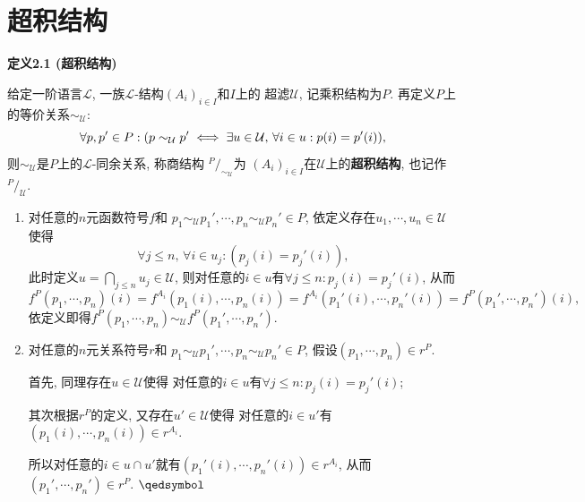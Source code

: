 \documentclass[UTF8]{ctexart}
\begin{document}
\newpage

\section{超积结构}

\hypertarget{sec:定义2.1}{}
\noindent\textbf{定义2.1 (超积结构)}

给定一阶语言$\mathcal{L}$, 一族$\mathcal{L}$-结构$(A_i)_{i\in I}$和$I$上的
超滤$\mathcal{U}$, 记乘积结构为$P$. 再定义$P$上的等价关系$\sim_{\mathcal{U}}$:
\[
    \forall p,p'\in P:(p\sim_{\mathcal{U}}p'\iff
    \exists u\in\mathcal{U},\,\forall i\in u:p(i)=p'(i)),\\[3pt]
\]
则$\sim_{\mathcal{U}}$是$P$上的$\mathcal{L}$-同余关系, 称商结构
$^{\displaystyle P}\!/_{\displaystyle\sim_{\mathcal{U}}}$为
$(A_i)_{i\in I}$在$\mathcal{U}$上的\textbf{超积结构},
也记作$^{\displaystyle P}\!/_{\displaystyle\mathcal{U}}$.


\begin{enumerate}
    \item 对任意的$n$元函数符号$f$和
    $p_1\sim_{\mathcal{U}}p_1',\cdots,p_n\sim_{\mathcal{U}}p_n'\in P$,
    依定义存在$u_1,\cdots,u_n\in\mathcal{U}$使得
    \[
        \forall j\leqslant n,\,\forall i\in u_j:(p_j(i)=p_j'(i)),
    \]
    此时定义$\displaystyle u=\bigcap_{j\leqslant n}u_j\in\mathcal{U}$,
    则对任意的$i\in u$有$\forall j\leqslant n:p_j(i)=p_j'(i)$, 从而
    \vspace{3pt}
    \[
        f^P(p_1,\cdots,p_n)(i)=f^{A_i}(p_1(i),\cdots,p_n(i))
        =f^{A_i}(p_1'(i),\cdots,p_n'(i))=f^P(p_1',\cdots,p_n')(i),
    \]
    依定义即得$f^P(p_1,\cdots,p_n)\sim_{\mathcal{U}}f^P(p_1',\cdots,p_n')$.

    \item 对任意的$n$元关系符号$r$和
    $p_1\sim_{\mathcal{U}}p_1',\cdots,p_n\sim_{\mathcal{U}}p_n'\in P$,
    假设$(p_1,\cdots,p_n)\in r^P$.

    \hspace{2.17em}
    首先, 同理存在$u\in\mathcal{U}$使得
    对任意的$i\in u$有$\forall j\leqslant n:p_j(i)=p_j'(i)$;

    \hspace{2.17em}
    其次根据$r^P$的定义, 又存在$u'\in\mathcal{U}$使得
    对任意的$i\in u'$有$(p_1(i),\cdots,p_n(i))\in r^{A_i}$.

    \hspace{2.17em}
    所以对任意的$i\in u\cap u'$就有$(p_1'(i),\cdots,p_n'(i))\in r^{A_i}$,
    从而$(p_1',\cdots,p_n')\in r^P$. \hfill $\qedsymbol$
\end{enumerate}
\end{document}
